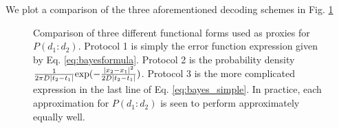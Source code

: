 \documentclass[twocolumn,superscriptaddress,aps,prb,floatfix]{revtex4-1}
\begin{document}
We plot a comparison of the three aforementioned decoding schemes in Fig. \ref{fig:decoding_comparison}

\begin{figure}
\begin{center}
\end{center}
\caption{Comparison of three different functional forms used as proxies for $P( d_1:d_2)$.  Protocol 1 is simply the error function expression given by Eq. \ref{eq:bayesformula}.  Protocol 2 is the probability density $\frac{1}{2\pi D |t_2-t_1|} {\rm exp}(-\frac{|x_2-x_1|^2}{2 D |t_2-t_1|})$.  Protocol 3 is the more complicated expression in the last line of Eq. \ref{eq:bayes_simple}.  In practice, each approximation for $P( d_1:d_2)$ is seen to perform approximately equally well.}
\label{fig:decoding_comparison}
\end{figure}



\end{document}
